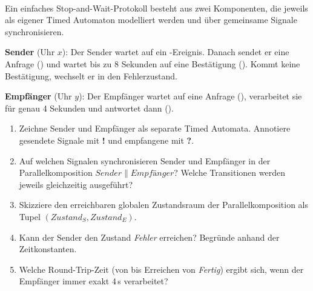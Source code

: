 \umbruchlsg


\\
Ein einfaches Stop-and-Wait-Protokoll besteht aus zwei Komponenten, die jeweils als eigener
Timed Automaton modelliert werden und über gemeinsame Signale synchronisieren.

\textbf{Sender} (Uhr $x$): Der Sender wartet auf ein -Ereignis. Danach sendet er
eine Anfrage () und wartet bis zu 8 Sekunden auf eine Bestätigung ().
Kommt keine Bestätigung, wechselt er in den Fehlerzustand.

\textbf{Empfänger} (Uhr $y$): Der Empfänger wartet auf eine Anfrage (), verarbeitet
sie für genau 4 Sekunden und antwortet dann ().

\begin{enumerate}
  \item Zeichne Sender und Empfänger als separate Timed Automata. Annotiere gesendete
        Signale mit \textbf{!} und empfangene mit \textbf{?}.
  \item Auf welchen Signalen synchronisieren Sender und Empfänger in der
        Parallelkomposition $\mathit{Sender} \| \textit{Empfänger}$? Welche
        Transitionen werden jeweils gleichzeitig ausgeführt?
  \item Skizziere den erreichbaren globalen Zustandsraum der Parallelkomposition als
        Tupel $(\mathit{Zustand}_S, \mathit{Zustand}_E)$.
  \item Kann der Sender den Zustand \textit{Fehler} erreichen? Begründe anhand der
        Zeitkonstanten.
  \item Welche Round-Trip-Zeit (von  bis Erreichen von \textit{Fertig})
        ergibt sich, wenn der Empfänger immer exakt 4\,s verarbeitet?
\end{enumerate}

